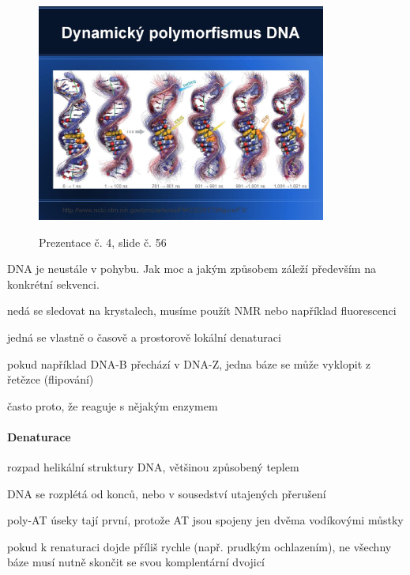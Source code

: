 \documentclass[DIV=8]{scrreprt}
\begin{document}
\begin{figure}
    \caption{Prezentace č. 4, slide č. 56}
    \includegraphics[width=0.85\textwidth]{slides-4/slide-56.jpg}
    \centering
    \label{slides-4-slide-56}
\end{figure}

DNA je neustále v pohybu. Jak moc a jakým způsobem záleží především na konkrétní sekvenci.

\begin{myItemize}[nosep]
    \item nedá se sledovat na krystalech, musíme použít NMR nebo například fluorescenci
    \item jedná se vlastně o časově a prostorově lokální denaturaci
    \item pokud například DNA-B přechází v DNA-Z, jedna báze se může vyklopit z řetězce (flipování)
\begin{myItemize}[nosep]
    \item často proto, že reaguje s nějakým enzymem
\end{myItemize}

\end{myItemize}



\paragraph{Denaturace}
\begin{myItemize}[nosep]
    \item rozpad helikální struktury DNA, většinou způsobený teplem
    \item DNA se rozplétá od konců, nebo v sousedství utajených přerušení
    \item poly-AT úseky tají první, protože AT jsou spojeny jen dvěma vodíkovými můstky
    \item pokud k renaturaci dojde příliš rychle (např. prudkým ochlazením), ne všechny báze musí nutně skončit se svou komplentární dvojicí
\end{myItemize}
\end{document}
